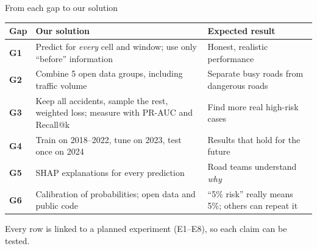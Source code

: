 \documentclass[aspectratio=169,11pt,t]{beamer}
\newcommand{\pname}{}
\newcommand{\ppart}{0}
\newcommand{\presenter}[3]{%
  \colorlet{pc}{#1}\renewcommand{\ppart}{#2}\renewcommand{\pname}{#3}}
\begin{document}
\begin{frame}{From each gap to our solution}
\footnotesize
\renewcommand{\arraystretch}{1.28}
\begin{tabularx}{\textwidth}{@{}>{\bfseries\color{p2}}l >{\raggedright\arraybackslash}X >{\raggedright\arraybackslash}X@{}}
\toprule
\color{ink}Gap & \textbf{Our solution} & \textbf{Expected result} \\
\midrule
G1 & Predict for \emph{every} cell and window; use only ``before'' information & Honest, realistic performance \\
G2 & Combine 5 open data groups, including traffic volume & Separate busy roads from dangerous roads \\
G3 & Keep all accidents, sample the rest, weighted loss; measure with PR-AUC and Recall@k & Find more real high-risk cases \\
G4 & Train on 2018--2022, tune on 2023, test once on 2024 & Results that hold for the future \\
G5 & SHAP explanations for every prediction & Road teams understand \emph{why} \\
G6 & Calibration of probabilities; open data and public code & ``5\% risk'' really means 5\%; others can repeat it \\
\bottomrule
\end{tabularx}
\vspace{2mm}
\begin{center}\scriptsize\color{black!60}
Every row is linked to a planned experiment (E1--E8), so each claim can be tested.
\end{center}
\end{frame}

\presenter{p3}{3}{Solomon Mbedzi}
\end{document}
